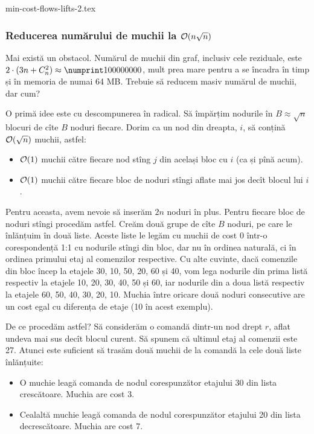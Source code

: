 \documentclass[../main.tex]{subfiles}
\begin{document}
{min-cost-flows-lifts-2.tex}

\subsubsection*{Reducerea numărului de muchii la \texorpdfstring{$\mathcal{O}(n \sqrt{n})$}{n sqrt n}}

Mai există un obstacol. Numărul de muchii din graf, inclusiv cele reziduale, este $2 \cdot (3n + C_n^2 ) \approx \np{100000000}$, mult prea mare pentru a se încadra în timp și în memoria de numai 64 MB. Trebuie să reducem masiv numărul de muchii, dar cum?

O primă idee este cu descompunerea în radical. Să împărțim nodurile în $B \approx \sqrt{n}$ blocuri de cîte $B$ noduri fiecare. Dorim ca un nod din dreapta, $i$, să conțină $\mathcal{O}(\sqrt{n})$ muchii, astfel:

\begin{itemize}
  \item $\mathcal{O}(1)$ muchii către fiecare nod stîng $j$ din același bloc cu $i$ (ca și pînă acum).
  \item $\mathcal{O}(1)$ muchii către fiecare bloc de noduri stîngi aflate mai jos decît blocul lui $i$.
\end{itemize}

Pentru aceasta, avem nevoie să inserăm $2n$ noduri în plus. Pentru fiecare bloc de noduri stîngi procedăm astfel. Creăm două grupe de cîte $B$ noduri, pe care le înlănțuim în două liste. Aceste liste le legăm cu muchii de cost 0 într-o corespondență 1:1 cu nodurile stîngi din bloc, dar nu în ordinea naturală, ci în ordinea primului etaj al comenzilor respective. Cu alte cuvinte, dacă comenzile din bloc încep la etajele 30, 10, 50, 20, 60 și 40, vom lega nodurile din prima listă respectiv la etajele 10, 20, 30, 40, 50 și 60, iar nodurile din a doua listă respectiv la etajele 60, 50, 40, 30, 20, 10. Muchia între oricare două noduri consecutive are un cost egal cu diferența de etaje (10 în acest exemplu).

De ce procedăm astfel? Să considerăm o comandă dintr-un nod drept $r$, aflat undeva mai sus decît blocul curent. Să spunem că ultimul etaj al comenzii este 27. Atunci este suficient să trasăm două muchii de la comandă la cele două liste înlănțuite:

\begin{itemize}
  \item O muchie leagă comanda de nodul corespunzător etajului 30 din lista crescătoare. Muchia are cost 3.
  \item Cealaltă muchie leagă comanda de nodul corespunzător etajului 20 din lista decrescătoare. Muchia are cost 7.
\end{itemize}
\end{document}
